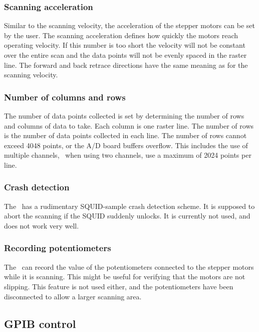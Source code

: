 \subsubsection{Scanning acceleration}
Similar to the scanning velocity, the acceleration of the 
stepper motors can be set by the user. The scanning acceleration
defines how quickly the motors reach operating velocity. 
If this number is too short the velocity will not be constant
over the entire scan and the data points will not be
evenly spaced in the raster line. The forward and back 
retrace directions have the same meaning as for the scanning 
velocity. 

\subsubsection{Number of columns and rows}
The number of data points collected is set by determining
the number of rows and columns of data to take. Each column
is one raster line. The number of rows is the number of data
points collected in each line. The number of rows cannot exceed
4048 points, or the A/D board buffers overflow. This includes
the use of multiple channels, \ie\ when using two channels, use a maximum
of 2024 points per line. 

\subsubsection{Crash detection}
The \squidbox\ has a rudimentary SQUID-sample crash detection scheme. 
It is supposed to abort the scanning if the SQUID suddenly
unlocks. It is currently not used, and does not work very
well. 

\subsubsection{Recording potentiometers}
The \squidbox\ 
can record the value of the potentiometers connected to the stepper
motors while it is scanning. This might be useful for verifying that
the motors are not slipping. This feature is not used either, and the 
potentiometers have been disconnected to allow a larger scanning
area. 

\subsection{GPIB control}

